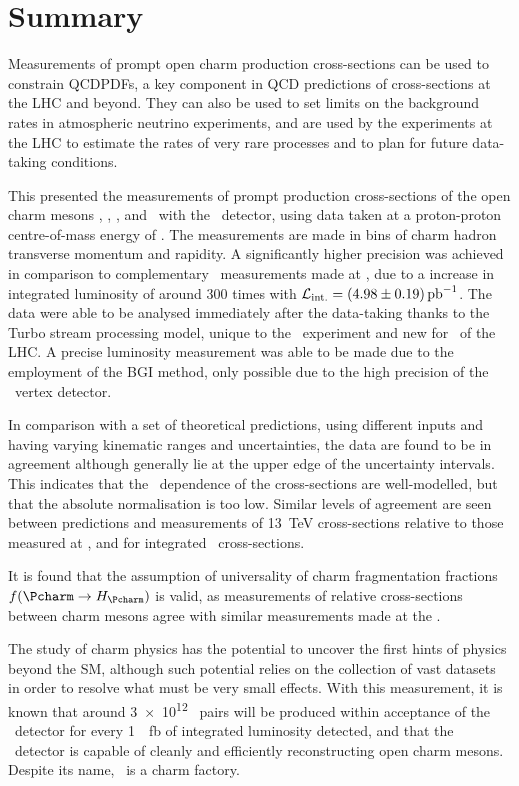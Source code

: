 \chapter{Summary}
\label{chap:prod:summary}

Measurements of prompt open charm production cross-sections can be used to 
constrain \aclp{QCDPDF}, a key component in \ac{QCD} predictions of 
cross-sections at the \ac{LHC} and beyond.
They can also be used to set limits on the background rates in atmospheric 
neutrino experiments, and are used by the experiments at the \ac{LHC} to 
estimate the rates of very rare processes and to plan for future data-taking 
conditions.

This  presented the measurements of prompt production 
cross-sections of the open charm mesons \PDzero, \PDplus, \PDsplus, and 
\PDstarp\ with the \lhcb\ detector, using data taken at a proton-proton 
centre-of-mass energy of .
The measurements are made in bins of charm hadron transverse momentum and 
rapidity.
A significantly higher precision was achieved in comparison to complementary 
\lhcb\ measurements made at , due to a increase in integrated 
luminosity of around 300 times with $\intlumi = 
\SI{\xsectotlumi}{\per\pico\barn}$.
The data were able to be analysed immediately after the data-taking thanks to 
the Turbo stream processing model, unique to the \lhcb\ experiment and new for 
\runtwo\ of the \ac{LHC}.
A precise luminosity measurement was able to be made due to the employment of 
the \acl{BGI} method, only possible due to the high precision of the \lhcb\ 
vertex detector.

In comparison with a set of theoretical predictions, using different inputs and 
having varying kinematic ranges and uncertainties, the data are found to be in 
agreement although generally lie at the upper edge of the uncertainty 
intervals.
This indicates that the \pTy\ dependence of the cross-sections are 
well-modelled, but that the absolute normalisation is too low.
Similar levels of agreement are seen between predictions and measurements of 
\SI{13}{\TeV} cross-sections relative to those measured at \sqrtseq{7}, and for 
integrated \ccbar\ cross-sections.

It is found that the assumption of universality of charm fragmentation 
fractions $f(\cToHc)$ is valid, as measurements of relative cross-sections 
between charm mesons agree with similar measurements made at the \bfactories.

The study of charm physics has the potential to uncover the first hints of 
physics beyond the \ac{SM}, although such potential relies on the collection of 
vast datasets in order to resolve what must be very small effects.
With this measurement, it is known that around \num{3e12} \ccbar\ pairs will be 
produced within acceptance of the \lhcb\ detector for every 
\SI{1}{\per\femto\barn} of integrated luminosity detected, and that the \lhcb\ 
detector is capable of cleanly and efficiently reconstructing open charm 
mesons.
Despite its name, \lhcb\ is a charm factory.
